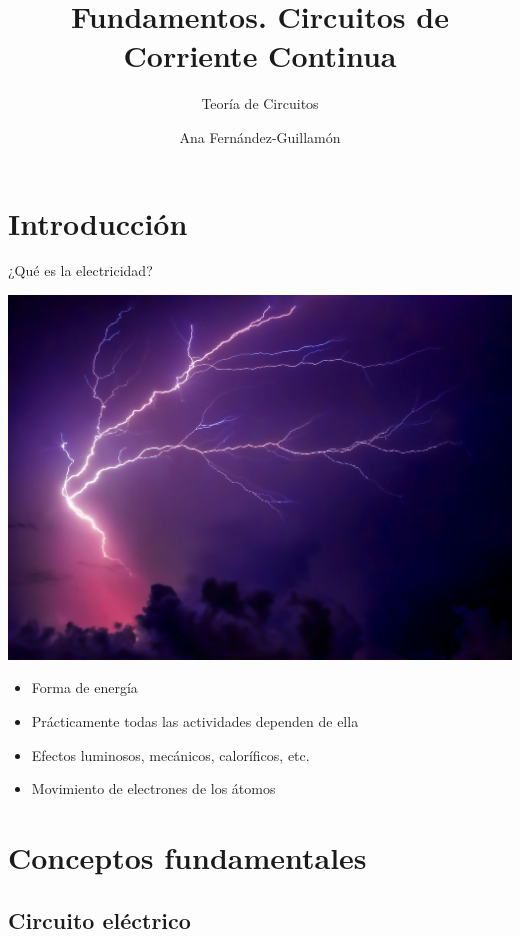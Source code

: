 \documentclass[aspectratio=169, xcolor={usenames,svgnames,dvipsnames}]{beamer}
\author{Ana Fernández-Guillamón}
\date{}
\title{Fundamentos. Circuitos de Corriente Continua}
\subtitle{Teoría de Circuitos}
\begin{document}
\maketitle

\section{Introducción}

\begin{frame}{¿Qué es la electricidad?}
\begin{minipage}[c]{0.55\linewidth}
    \includegraphics[width=\linewidth]{../figs/26261784989_0c084cd428_b.jpg}
\end{minipage}
\hfill%
\begin{minipage}[c]{0.38\linewidth}
    \pause
    \begin{itemize}
        \item Forma de energía
        \item Prácticamente todas las actividades dependen de ella
        \item Efectos luminosos, mecánicos, caloríficos, etc.
        \item Movimiento de electrones de los átomos
    \end{itemize}
\end{minipage}
\end{frame}

\section{Conceptos fundamentales}

\subsection{Circuito eléctrico}
\end{document}
